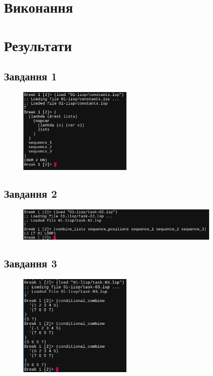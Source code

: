 \documentclass[a4paper, 12pt]{extarticle}
\begin{document}
\section{Виконання}






\section{Результати}
\subsection{Завдання 1}
\begin{figure}[H]
  \centering
  \includegraphics[width=0.5\textwidth]{screenshots/task-01.png}
\end{figure}
\subsection{Завдання 2}
\begin{figure}[H]
  \centering
  \includegraphics[width=0.9\textwidth]{screenshots/task-02.png}
\end{figure}
\subsection{Завдання 3}
\begin{figure}[H]
  \centering
  \includegraphics[width=0.5\textwidth]{screenshots/task-03.png}
\end{figure}
\end{document}
